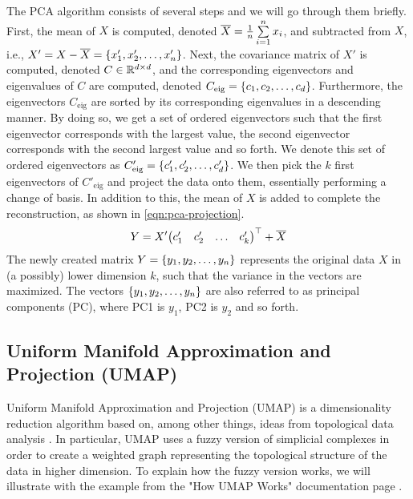 The PCA algorithm consists of several steps and we will go through them briefly. First, the mean of $X$ is computed, denoted $\overline{X} = \frac{1}{n} \sum\limits_{i=1}^{n} x_i$, and subtracted from $X$, i.e., $X' = X - \overline{X} = \left\{x'_1, x'_2, \ldots, x'_n\right\}$. Next, the covariance matrix of $X'$ is computed, denoted $C \in \mathbb{R}^{d \times d}$, and the corresponding eigenvectors and eigenvalues of $C$ are computed, denoted $C_\text{eig} = \left\{c_1, c_2, \ldots, c_d\right\}$. Furthermore, the eigenvectors $C_\text{eig}$ are sorted by its corresponding eigenvalues in a descending manner. By doing so, we get a set of ordered eigenvectors such that the first eigenvector corresponds with the largest value, the second eigenvector corresponds with the second largest value and so forth. We denote this set of ordered eigenvectors as $C'_\text{eig} = \left\{c'_1, c'_2, \ldots, c'_d\right\}$. We then pick the $k$ first eigenvectors of $C'_\text{eig}$ and project the data onto them, essentially performing a change of basis. In addition to this, the mean of $X$ is added to complete the reconstruction, as shown in \cref{eqn:pca-projection}.
\begin{align}
    \label{eqn:pca-projection}
    Y = X' {\begin{pmatrix}
    c'_1 & c'_2 & \ldots & c'_k
    \end{pmatrix}}^\top + \overline{X}
\end{align}
The newly created matrix $Y = \left\{y_1, y_2, \ldots, y_n\right\}$ represents the original data $X$ in (a possibly) lower dimension $k$, such that the variance in the vectors are maximized. The vectors $\left\{y_1, y_2, \ldots, y_n\right\}$ are also referred to as principal components (PC), where PC1 is $y_1$, PC2 is $y_2$ and so forth.

\subsection{Uniform Manifold Approximation and Projection (UMAP)}
\label{sec:umap}
Uniform Manifold Approximation and Projection (UMAP) is a dimensionality reduction algorithm based on, among other things, ideas from topological data analysis \cite{2018arXivUMAP}. In particular, UMAP uses a fuzzy version of simplicial complexes in order to create a weighted graph representing the topological structure of the data in higher dimension. To explain how the fuzzy version works, we will illustrate with the example from the "How UMAP Works" documentation page \cite{how-umap-works-2018}.

